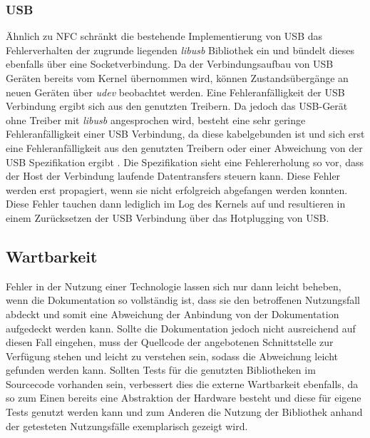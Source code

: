           \subsubsection{USB} Ähnlich zu NFC schränkt die bestehende Implementierung von USB das Fehlerverhalten der zugrunde liegenden {\it libusb} Bibliothek ein und bündelt dieses ebenfalls über eine Socketverbindung. Da der Verbindungsaufbau von USB Geräten bereits vom Kernel übernommen wird, können Zustandsübergänge an neuen Geräten über {\it udev} beobachtet werden. Eine Fehleranfälligkeit der USB Verbindung ergibt sich aus den genutzten Treibern. Da jedoch das USB-Gerät ohne Treiber mit {\it libusb} angesprochen wird, besteht eine sehr geringe Fehleranfälligkeit einer USB Verbindung, da diese kabelgebunden ist und sich erst eine Fehleranfälligkeit aus den genutzten Treibern oder einer Abweichung von der USB Spezifikation ergibt \cite{usbSpec}. Die Spezifikation sieht eine Fehlererholung so vor, dass der Host der Verbindung laufende Datentransfers steuern kann. Diese Fehler werden erst propagiert, wenn sie nicht erfolgreich abgefangen werden konnten. Diese Fehler tauchen dann lediglich im Log des Kernels auf und resultieren in einem Zurücksetzen der USB Verbindung über das Hotplugging von USB.
		
		\subsection{Wartbarkeit}
		Fehler in der Nutzung einer Technologie lassen sich nur dann leicht beheben, wenn die Dokumentation so vollständig ist, dass sie den betroffenen Nutzungsfall abdeckt und somit eine Abweichung der Anbindung von der Dokumentation aufgedeckt werden kann. Sollte die Dokumentation jedoch nicht ausreichend auf diesen Fall eingehen, muss der Quellcode der angebotenen Schnittstelle zur Verfügung stehen und leicht zu verstehen sein, sodass die Abweichung leicht gefunden werden kann. Sollten Tests für die genutzten Bibliotheken im Sourcecode vorhanden sein, verbessert dies die externe Wartbarkeit ebenfalls, da so zum Einen bereits eine Abstraktion der Hardware besteht und diese für eigene Tests genutzt werden kann und zum Anderen die Nutzung der Bibliothek anhand der getesteten Nutzungsfälle exemplarisch gezeigt wird.
		
